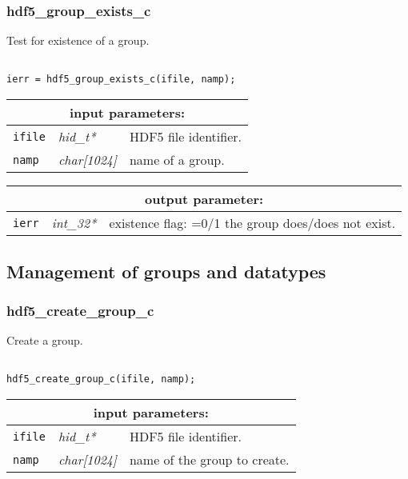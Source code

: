 \subsubsection{hdf5\_group\_exists\_c}

Test for existence of a group.

\begin{verbatim}

ierr = hdf5_group_exists_c(ifile, namp);
\end{verbatim}

\noindent
\begin{tabular}{|p{1.5cm}|p{2cm}|p{11cm}|}
\hline
\multicolumn{3}{|c|}{\bf input parameters:} \\
\hline
{\tt ifile} & {\it hid\_t*} & HDF5 file identifier. \\
\hline
{\tt namp} & {\it char[1024]} & name of a group. \\
\hline
\end{tabular}

\vskip 0.8cm

\noindent
\begin{tabular}{|p{1.5cm}|p{2cm}|p{11cm}|}
\hline
\multicolumn{3}{|c|}{\bf output parameter:} \\
\hline
{\tt ierr} & {\it int\_32*} & existence flag: =0/1 the group does/does not exist. \\
\hline
\end{tabular}

\vskip 0.8cm

\subsection{Management of groups and datatypes}

\subsubsection{hdf5\_create\_group\_c}

Create a group.

\begin{verbatim}

hdf5_create_group_c(ifile, namp);
\end{verbatim}

\noindent
\begin{tabular}{|p{1.5cm}|p{2cm}|p{11cm}|}
\hline
\multicolumn{3}{|c|}{\bf input parameters:} \\
\hline
{\tt ifile} & {\it hid\_t*} & HDF5 file identifier. \\
\hline
{\tt namp} & {\it char[1024]} & name of the group to create. \\
\hline
\end{tabular}

